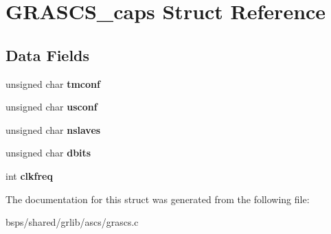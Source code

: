 \hypertarget{structGRASCS__caps}{}\section{G\+R\+A\+S\+C\+S\+\_\+caps Struct Reference}
\label{structGRASCS__caps}
\subsection*{Data Fields}
\begin{DoxyCompactItemize}
\item 
\mbox{\label{structGRASCS__caps_a9089b72284c5d655513ca03ebe59f158}} 
unsigned char {\bfseries tmconf}
\item 
\mbox{\label{structGRASCS__caps_aa801a8cd37a1ccd0ee46857cfcd9d17a}} 
unsigned char {\bfseries usconf}
\item 
\mbox{\label{structGRASCS__caps_a9fed6ed102efc81c5264973b65b0c7f5}} 
unsigned char {\bfseries nslaves}
\item 
\mbox{\label{structGRASCS__caps_a902c09b00771c1b4b6a2370be681638e}} 
unsigned char {\bfseries dbits}
\item 
\mbox{\label{structGRASCS__caps_ad845e53bbd55a8ffd72f7855e296d93a}} 
int {\bfseries clkfreq}
\end{DoxyCompactItemize}


The documentation for this struct was generated from the following file\+:\begin{DoxyCompactItemize}
\item 
bsps/shared/grlib/ascs/grascs.\+c\end{DoxyCompactItemize}
